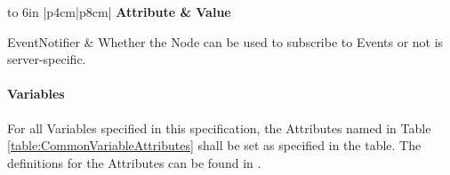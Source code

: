 \begin{table}[ht]
\centering 
  \caption{Common Object Attributes}
  \label{table:CommonObjectAttributes}
\fontsize{9pt}{11pt}\selectfont
\tabulinesep=3pt
\begin{tabu} to 6in {|p{4cm}|p{8cm}|} \everyrow{\hline}
\hline
\rowfont \bfseries Attribute & Value \\
\tabucline[1.5pt]{}

EventNotifier & Whether the Node can be used to subscribe to Events or not is server-specific.\\

\end{tabu}
\end{table} 


\FloatBarrier

\paragraph{Variables}

For all \glspl{Variable} specified in this specification, the \glspl{Attribute} named in Table \ref{table:CommonVariableAttributes} shall be set as specified in the table. The definitions for the \glspl{Attribute} can be found in \cite{UAPart3}.

